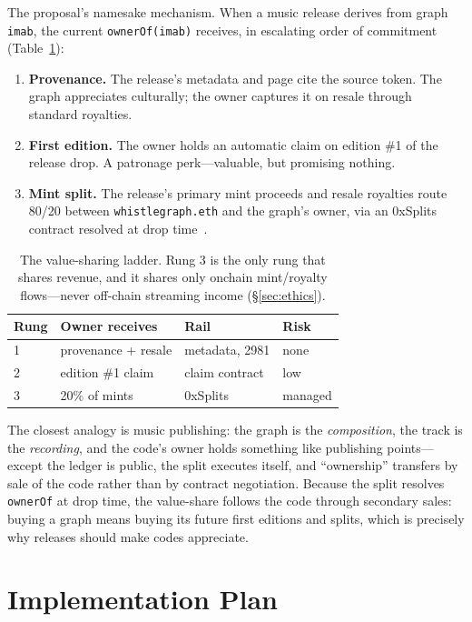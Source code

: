 \documentclass[10pt,letterpaper,twocolumn]{article}
\newcommand{\code}[1]{\texttt{#1}}
\begin{document}
The proposal's namesake mechanism. When a music release derives from graph \code{imab}, the current \code{ownerOf(imab)} receives, in escalating order of commitment (Table~\ref{tab:ladder}):

\begin{enumerate}
  \item \textbf{Provenance.} The release's metadata and page cite the source token. The graph appreciates culturally; the owner captures it on resale through standard royalties.
  \item \textbf{First edition.} The owner holds an automatic claim on edition \#1 of the release drop. A patronage perk---valuable, but promising nothing.
  \item \textbf{Mint split.} The release's primary mint proceeds and resale royalties route 80/20 between \code{whistlegraph.eth} and the graph's owner, via an 0xSplits contract resolved at drop time~\citep{splits2022}.
\end{enumerate}

\begin{table}[h]
\centering\small
\begin{tabular}{@{}llll@{}}
\toprule
\textbf{Rung} & \textbf{Owner receives} & \textbf{Rail} & \textbf{Risk} \\
\midrule
1 & provenance + resale & metadata, 2981 & none \\
2 & edition \#1 claim & claim contract & low \\
3 & 20\% of mints & 0xSplits & managed \\
\bottomrule
\end{tabular}
\caption{The value-sharing ladder. Rung 3 is the only rung that shares revenue, and it shares only onchain mint/royalty flows---never off-chain streaming income (\S\ref{sec:ethics}).}
\label{tab:ladder}
\end{table}

The closest analogy is music publishing: the graph is the \emph{composition}, the track is the \emph{recording}, and the code's owner holds something like publishing points---except the ledger is public, the split executes itself, and ``ownership'' transfers by sale of the code rather than by contract negotiation. Because the split resolves \code{ownerOf} at drop time, the value-share follows the code through secondary sales: buying a graph means buying its future first editions and splits, which is precisely why releases should make codes appreciate.

\section{Implementation Plan}
\end{document}

